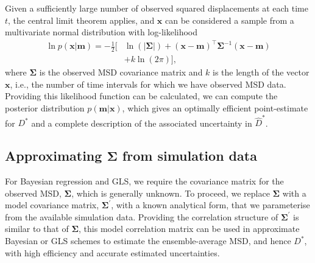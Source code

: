 \documentclass[reprint,superscriptaddress,nobibnotes,amsmath,amssymb,aps,prx,hidelinks,linenumbers]{revtex4-2}
\newcommand{\oMSD}{\ensuremath{\bm{x}}}
\newcommand{\model}{\bm{m}}
\newcommand{\prob}[1]{\ensuremath{p(#1)}}
\newcommand{\Dest}{\ensuremath{\widehat{D}^*}}
\newcommand{\D}{\ensuremath{D^*}}
\begin{document}
Given a sufficiently large number of observed squared displacements at each time $t$, the central limit theorem applies, and $\oMSD$ can be considered a sample from a multivariate normal distribution with log-likelihood
%
\begin{equation}
    \begin{aligned}{}
      \ln \prob{\oMSD|\model} = -\frac{1}{2}\big[ & \ln(\left|\mathbf{\Sigma}\right|) + {(\oMSD - \model)}^{\!\top}\mathbf{\Sigma}^{-1}(\oMSD - \model) \\ 
      & + k \ln(2\pi)\big],
    \end{aligned}
    \label{equ:loglike}
\end{equation}
%
where $\mathbf{\Sigma}$ is the observed MSD covariance matrix and $k$ is the length of the vector $\oMSD$, i.e., the number of time intervals for which we have observed MSD data.
Providing this likelihood function can be calculated, we can compute the posterior distribution $\prob{\model | \oMSD}$, which gives an optimally efficient point-estimate for $\D$ and a complete description of the associated uncertainty in $\Dest$.

\subsection{Approximating $\bm{\Sigma}$ from simulation data}

For Bayesian regression and GLS, we require the covariance matrix for the observed MSD, $\mathbf{\Sigma}$, which is generally unknown.
To proceed, we replace $\mathbf{\Sigma}$ with a model covariance matrix, $\mathbf{\Sigma^\prime}$, with a known analytical form, that we parameterise from the available simulation data.
Providing the correlation structure of $\mathbf{\Sigma^\prime}$ is similar to that of $\mathbf{\Sigma}$, this model correlation matrix can be used in approximate Bayesian or GLS schemes to estimate the ensemble-average MSD, and hence $\D$, with high efficiency and accurate estimated uncertainties.
\end{document}
